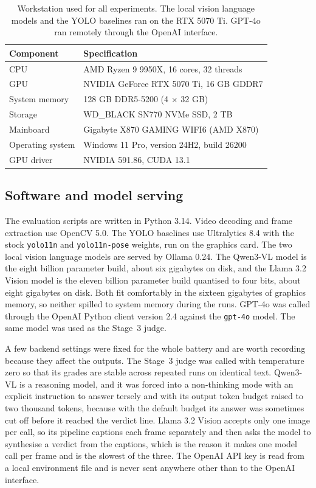 \begin{table}[h]
\centering
\small
\setlength{\tabcolsep}{8pt}
\begin{tabular}{@{}l l@{}}
\toprule
Component & Specification \\
\midrule
CPU              & AMD Ryzen 9 9950X, 16 cores, 32 threads \\
GPU             & NVIDIA GeForce RTX 5070 Ti, 16 GB GDDR7 \\
System memory   & 128 GB DDR5-5200 (4 $\times$ 32 GB) \\
Storage         & WD\_BLACK SN770 NVMe SSD, 2 TB \\
Mainboard       & Gigabyte X870 GAMING WIFI6 (AMD X870) \\
Operating system & Windows 11 Pro, version 24H2, build 26200 \\
GPU driver      & NVIDIA 591.86, CUDA 13.1 \\
\bottomrule
\end{tabular}
\caption{Workstation used for all experiments. The local vision language
models and the YOLO baselines ran on the RTX 5070 Ti. GPT-4o ran remotely
through the OpenAI interface.}
\label{tab:setup-hw}
\end{table}
\FloatBarrier

\subsection{Software and model serving}

The evaluation scripts are written in Python 3.14. Video decoding and
frame extraction use OpenCV 5.0. The YOLO baselines use Ultralytics 8.4
with the stock \texttt{yolo11n} and \texttt{yolo11n-pose} weights, run on
the graphics card. The two local vision language models are served by
Ollama 0.24. The Qwen3-VL model is the eight billion parameter build,
about six gigabytes on disk, and the Llama 3.2 Vision model is the eleven
billion parameter build quantised to four bits, about eight gigabytes on
disk. Both fit comfortably in the sixteen gigabytes of graphics memory,
so neither spilled to system memory during the runs. GPT-4o was called
through the OpenAI Python client version 2.4 against the \texttt{gpt-4o}
model. The same model was used as the Stage~3 judge.

A few backend settings were fixed for the whole battery and are worth
recording because they affect the outputs. The Stage~3 judge was called
with temperature zero so that its grades are stable across repeated runs
on identical text. Qwen3-VL is a reasoning model, and it was forced into a
non-thinking mode with an explicit instruction to answer tersely and with
its output token budget raised to two thousand tokens, because with the
default budget its answer was sometimes cut off before it reached the
verdict line. Llama 3.2 Vision accepts only one image per call, so its
pipeline captions each frame separately and then asks the model to
synthesise a verdict from the captions, which is the reason it makes one
model call per frame and is the slowest of the three. The OpenAI API key
is read from a local environment file and is never sent anywhere other
than to the OpenAI interface.

